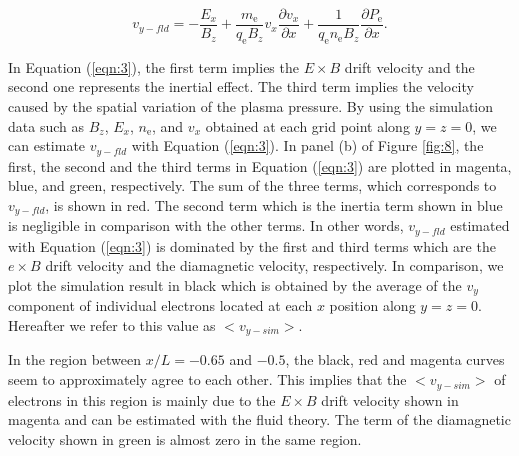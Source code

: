 \documentclass[draft,jgrga]{agutex2015}
\begin{document}
\begin{article}
\begin{linenomath}
 \begin{equation}
  v_{y-fld} = 
   - \frac{E_x}{B_z} 
   + \frac {m_\mathrm{e}}{q_\mathrm{e} B_z}v_x\frac{\partial v_x}{\partial x}
   + \frac{1}{q_\mathrm{e} n_\mathrm{e} B_z}\frac{\partial P_{\mathrm{e}}}{\partial x}.
 \label{eqn:3}
 \end{equation}
\end{linenomath}

In Equation (\ref{eqn:3}), 
the first term implies the $E \times B$ drift velocity and 
the second one represents the inertial effect. 
The third term implies the velocity caused 
by the spatial variation of the plasma pressure. 
By using the simulation data such as $B_z$, $E_x$, $n_\mathrm{e}$, 
and $v_x$ obtained at each grid point along $y=z=0$, 
we can estimate $v_{y-fld}$ with Equation (\ref{eqn:3}). 
In panel (b) of Figure \ref{fig:8}, 
the first, the second and the third terms in Equation (\ref{eqn:3}) are plotted 
in magenta, blue, and green, respectively.  
The sum of the three terms, which corresponds to $v_{y-fld}$,
is shown in red. 
The second term which is the inertia term shown in blue is negligible 
in comparison with the other terms. 
In other words, $v_{y-fld}$ estimated with Equation (\ref{eqn:3}) is 
dominated by the first and third terms
which are the $e \times B$  drift velocity and the diamagnetic velocity, respectively. 
In comparison, 
we plot the simulation result in black which is obtained 
by the average of the $v_y$ component of individual electrons
located at each $x$ position along $y=z=0$.
Hereafter we refer to this value as $<v_{y-sim}>$. 

In the region between $x/L=-0.65$ and $-0.5$, 
the black, red and magenta curves seem to approximately agree to each other. 
This implies that the $<v_{y-sim}>$ of electrons in this region 
is mainly due to the $E \times B$ drift velocity shown in magenta
and can be estimated with the fluid theory. 
The term of the diamagnetic velocity shown in green is almost zero 
in the same region.  


\end{article}
\end{document}
